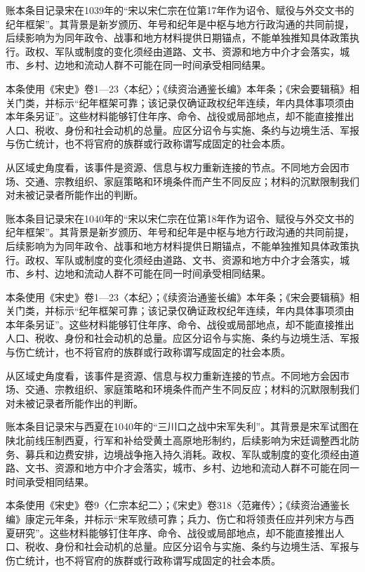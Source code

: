 账本条目记录宋在1039年的“宋以宋仁宗在位第17年作为诏令、赋役与外交文书的纪年框架”。其背景是新岁颁历、年号和纪年是中枢与地方行政沟通的共同前提，后续影响为为同年政令、战事和地方材料提供日期锚点，不能单独推知具体政策执行。政权、军队或制度的变化须经由道路、文书、资源和地方中介才会落实，城市、乡村、边地和流动人群不可能在同一时间承受相同结果。

本条使用《宋史》卷1—23〈本纪〉；《续资治通鉴长编》本年条；《宋会要辑稿》相关门类，并标示“纪年框架可靠；该记录仅确证政权纪年连续，年内具体事项须由本年条另证”。这些材料能够钉住年序、命令、战役或局部地点，却不能直接推出人口、税收、身份和社会动机的总量。应区分诏令与实施、条约与边境生活、军报与伤亡统计，也不将官府的族群或行政称谓写成固定的社会本质。

从区域史角度看，该事件是资源、信息与权力重新连接的节点。不同地方会因市场、交通、宗教组织、家庭策略和环境条件而产生不同反应；材料的沉默限制我们对未被记录者所能作出的判断。

账本条目记录宋在1040年的“宋以宋仁宗在位第18年作为诏令、赋役与外交文书的纪年框架”。其背景是新岁颁历、年号和纪年是中枢与地方行政沟通的共同前提，后续影响为为同年政令、战事和地方材料提供日期锚点，不能单独推知具体政策执行。政权、军队或制度的变化须经由道路、文书、资源和地方中介才会落实，城市、乡村、边地和流动人群不可能在同一时间承受相同结果。

本条使用《宋史》卷1—23〈本纪〉；《续资治通鉴长编》本年条；《宋会要辑稿》相关门类，并标示“纪年框架可靠；该记录仅确证政权纪年连续，年内具体事项须由本年条另证”。这些材料能够钉住年序、命令、战役或局部地点，却不能直接推出人口、税收、身份和社会动机的总量。应区分诏令与实施、条约与边境生活、军报与伤亡统计，也不将官府的族群或行政称谓写成固定的社会本质。

从区域史角度看，该事件是资源、信息与权力重新连接的节点。不同地方会因市场、交通、宗教组织、家庭策略和环境条件而产生不同反应；材料的沉默限制我们对未被记录者所能作出的判断。

账本条目记录宋与西夏在1040年的“三川口之战中宋军失利”。其背景是宋军试图在陕北前线压制西夏，行军和补给受黄土高原地形制约，后续影响为宋廷调整西北防务、募兵和边费安排，边境战争拖入持久消耗。政权、军队或制度的变化须经由道路、文书、资源和地方中介才会落实，城市、乡村、边地和流动人群不可能在同一时间承受相同结果。

本条使用《宋史》卷9〈仁宗本纪二〉；《宋史》卷318〈范雍传〉；《续资治通鉴长编》康定元年条，并标示“宋军败绩可靠；兵力、伤亡和将领责任应并列宋方与西夏研究”。这些材料能够钉住年序、命令、战役或局部地点，却不能直接推出人口、税收、身份和社会动机的总量。应区分诏令与实施、条约与边境生活、军报与伤亡统计，也不将官府的族群或行政称谓写成固定的社会本质。

